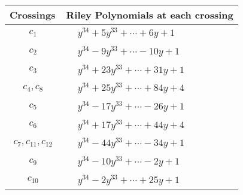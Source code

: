 \documentclass[1p]{elsarticle_modified}
\theoremstyle{definition}
\begin{document}
\begin{tabular}{m{50pt}|m{274pt}}
Crossings & \hspace{64pt}Riley Polynomials at each crossing \\
\hline $$\begin{aligned}c_{1}\end{aligned}$$&$\begin{aligned}
&y^{34}+5 y^{33}+\cdots+6 y+1
\end{aligned}$\\
\hline $$\begin{aligned}c_{2}\end{aligned}$$&$\begin{aligned}
&y^{34}-9 y^{33}+\cdots-10 y+1
\end{aligned}$\\
\hline $$\begin{aligned}c_{3}\end{aligned}$$&$\begin{aligned}
&y^{34}+23 y^{33}+\cdots+31 y+1
\end{aligned}$\\
\hline $$\begin{aligned}c_{4},c_{8}\end{aligned}$$&$\begin{aligned}
&y^{34}+25 y^{33}+\cdots+84 y+4
\end{aligned}$\\
\hline $$\begin{aligned}c_{5}\end{aligned}$$&$\begin{aligned}
&y^{34}-17 y^{33}+\cdots-26 y+1
\end{aligned}$\\
\hline $$\begin{aligned}c_{6}\end{aligned}$$&$\begin{aligned}
&y^{34}+17 y^{33}+\cdots+44 y+4
\end{aligned}$\\
\hline $$\begin{aligned}c_{7},c_{11},c_{12}\end{aligned}$$&$\begin{aligned}
&y^{34}-44 y^{33}+\cdots-34 y+1
\end{aligned}$\\
\hline $$\begin{aligned}c_{9}\end{aligned}$$&$\begin{aligned}
&y^{34}-10 y^{33}+\cdots-2 y+1
\end{aligned}$\\
\hline $$\begin{aligned}c_{10}\end{aligned}$$&$\begin{aligned}
&y^{34}-2 y^{33}+\cdots+25 y+1
\end{aligned}$\\
\hline
\end{tabular}\\~\\
\end{document}
